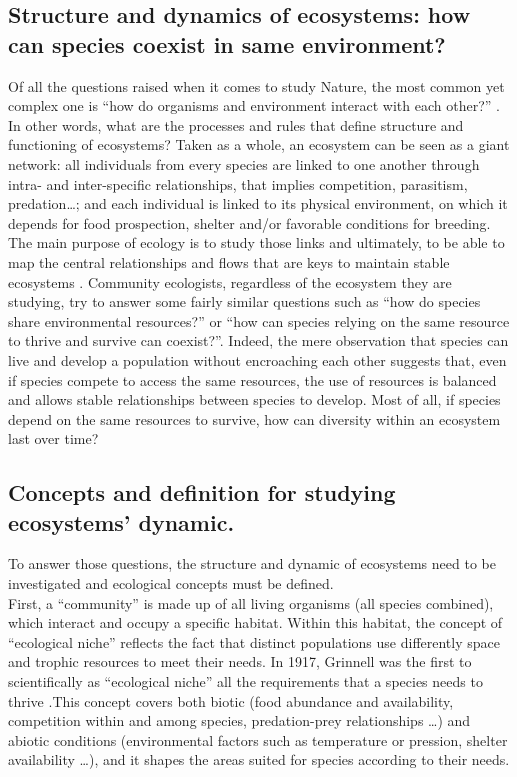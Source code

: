 

\subsection{Structure and dynamics of ecosystems: how can species coexist in same environment?} 

Of all the questions raised when it comes to study Nature, the most common yet complex one is “how do organisms and environment interact with each other?” \citep{sutherland2013}. In other words, what are the processes and rules that define structure and functioning of ecosystems? Taken as a whole, an ecosystem can be seen as a giant network: all individuals from every species are linked to one another through intra- and inter-specific relationships, that implies competition, parasitism, predation\ldots{}; and each individual is linked to its physical environment, on which it depends for food prospection, shelter and/or favorable conditions for breeding. The main purpose of ecology is to study those links and ultimately, to be able to map the central relationships and flows that are keys to maintain stable ecosystems \citep{albouy2011}. Community ecologists, regardless of the ecosystem they are studying, try to answer some fairly similar questions such as “how do species share environmental resources?” or “how can species relying on the same resource to thrive and survive can coexist?”. Indeed, the mere observation that species can live and develop a population without encroaching each other suggests that, even if species compete to access the same resources, the use of resources is balanced and allows stable relationships between species to develop. Most of all, if species depend on the same resources to survive, how can diversity within an ecosystem last over time?

\subsection{Concepts and definition for studying ecosystems’ dynamic.}
 
To answer those questions, the structure and dynamic of ecosystems need to be investigated and ecological concepts must be defined. \\ 
First, a ``community'' is made up of all living organisms (all species combined), which interact and occupy a specific habitat. Within this habitat, the concept of ``ecological niche'' reflects the fact that distinct populations use differently space and trophic resources to meet their needs. In 1917, Grinnell was the first to scientifically as ``ecological niche'' all the requirements that a species needs to thrive \citep{grinnell1917}.This concept covers both biotic (food abundance and availability, competition within and among species, predation-prey relationships \ldots{}) and abiotic conditions (environmental factors such as temperature or pression, shelter availability \ldots{}), and it shapes the areas suited for species according to their needs. 

